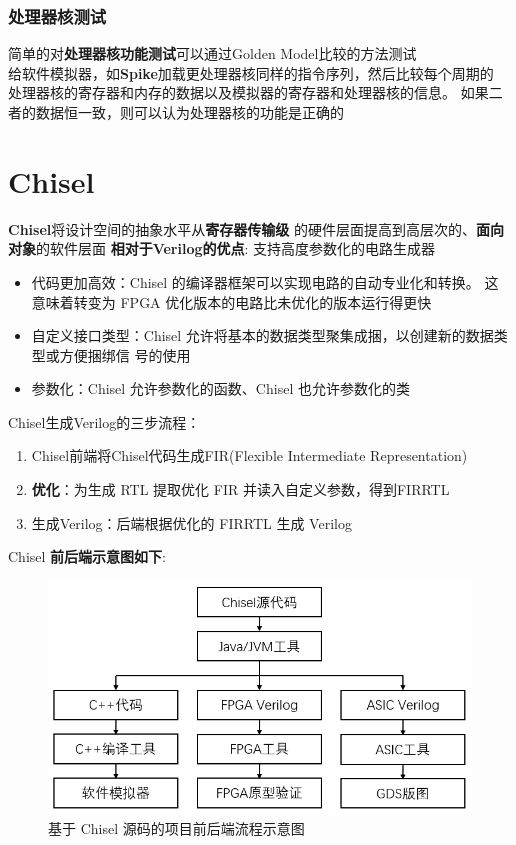 \documentclass{article}
\begin{document}
\subsubsection{处理器核测试}
简单的对\textbf{处理器核功能测试}可以通过Golden Model比较的方法测试\\ 
给软件模拟器，如\textbf{Spike}加载更处理器核同样的指令序列，然后比较每个周期的
处理器核的寄存器和内存的数据以及模拟器的寄存器和处理器核的信息\cite{riscv4}。 
如果二者的数据恒一致，则可以认为处理器核的功能是正确的

\section{Chisel}
\textbf{Chisel}将设计空间的抽象水平从\textbf{寄存器传输级} 的硬件层面提高到高层次的、\textbf{面向对象}的软件层面
\textbf{相对于Verilog的优点}: 支持高度参数化的电路生成器\cite{riscv2}
\begin{itemize}
  \item 代码更加高效：Chisel 的编译器框架可以实现电路的自动专业化和转换。 这意味着转变为 FPGA 优化版本的电路比未优化的版本运行得更快
  \item 自定义接口类型：Chisel 允许将基本的数据类型聚集成捆，以创建新的数据类型或方便捆绑信 号的使用
  \item 参数化：Chisel 允许参数化的函数、Chisel 也允许参数化的类
\end{itemize}
Chisel生成Verilog的三步流程：
\begin{enumerate}
  \item Chisel前端将Chisel代码生成FIR(Flexible Intermediate Representation)
  \item \textbf{优化}：为生成 RTL 提取优化 FIR 并读入自定义参数，得到FIRRTL
  \item 生成Verilog：后端根据优化的 FIRRTL 生成 Verilog
\end{enumerate}

Chisel \textbf{前后端示意图如下}:\cite{riscv3}
\begin{figure}[H]
\begin{center}
  \includegraphics[width=\textwidth]{chisel}
\end{center}
\caption{基于 Chisel 源码的项目前后端流程示意图}
\label{fig: chisel}
\end{figure}




\newpage
\end{document}

